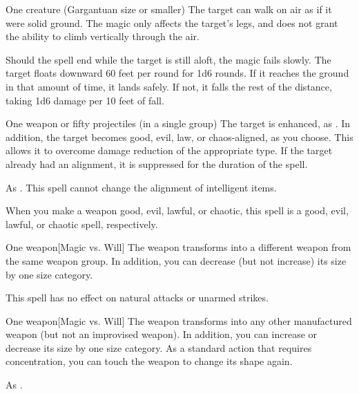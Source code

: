 \spellrng{\rngtouch}
\spelldur{\durshort}
\begin{spelltarget}{One creature (Gargantuan size or smaller)}
    \spelleffect The target can walk on air as if it were solid ground. The magic only affects the target's legs, and does not grant the ability to climb vertically through the air.
    \par Should the spell end while the target is still aloft, the magic fails slowly. The target floats downward 60 feet per round for 1d6 rounds. If it reaches the ground in that amount of time, it lands safely. If not, it falls the rest of the distance, taking 1d6 damage per 10 feet of fall.
\end{spelltarget}

\spellrng{\rngclose}
\begin{spelltarget}{One weapon or fifty projectiles (in a single group)}
    \spelleffect The target is enhanced, as . In addition, the target becomes good, evil, law, or chaos-aligned, as you choose. This allows it to overcome damage reduction of the appropriate type. If the target already had an alignment, it is suppressed for the duration of the spell.
\end{spelltarget}
\spellnotes As . This spell cannot change the alignment of intelligent items.

When you make a weapon good, evil, lawful, or chaotic, this spell is a good, evil, lawful, or chaotic spell, respectively.

\spelldur{\durmed}
\begin{spelltarget}{One weapon}[Magic vs. Will]
    \spellsuccess The weapon transforms into a different weapon from the same weapon group. In addition, you can decrease (but not increase) its size by one size category.
\end{spelltarget}
\spellnotes This spell has no effect on natural attacks or unarmed strikes.

\spelldur{\durmed}
\begin{spelltarget}{One weapon}[Magic vs. Will]
    \spellsuccess The weapon transforms into any other manufactured weapon (but not an improvised weapon). In addition, you can increase or decrease its size by one size category.
    \spelleffect As a standard action that requires concentration, you can touch the weapon to change its shape again.
\end{spelltarget}
\spellnotes As .

